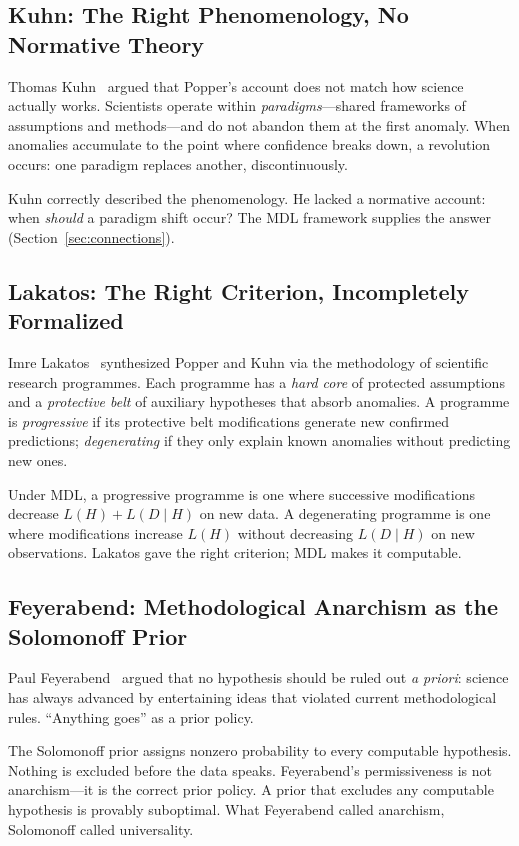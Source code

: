 \subsection{Kuhn: The Right Phenomenology, No Normative Theory}

Thomas Kuhn~\cite{kuhn1962} argued that Popper's account does not match how science actually works. Scientists operate within \emph{paradigms}---shared frameworks of assumptions and methods---and do not abandon them at the first anomaly. When anomalies accumulate to the point where confidence breaks down, a revolution occurs: one paradigm replaces another, discontinuously.

Kuhn correctly described the phenomenology. He lacked a normative account: when \emph{should} a paradigm shift occur? The MDL framework supplies the answer (Section~\ref{sec:connections}).

\subsection{Lakatos: The Right Criterion, Incompletely Formalized}

Imre Lakatos~\cite{lakatos1978} synthesized Popper and Kuhn via the methodology of scientific research programmes. Each programme has a \emph{hard core} of protected assumptions and a \emph{protective belt} of auxiliary hypotheses that absorb anomalies. A programme is \emph{progressive} if its protective belt modifications generate new confirmed predictions; \emph{degenerating} if they only explain known anomalies without predicting new ones.

Under MDL, a progressive programme is one where successive modifications decrease $L(H) + L(D \mid H)$ on new data. A degenerating programme is one where modifications increase $L(H)$ without decreasing $L(D \mid H)$ on new observations. Lakatos gave the right criterion; MDL makes it computable.

\subsection{Feyerabend: Methodological Anarchism as the Solomonoff Prior}

Paul Feyerabend~\cite{feyerabend1975} argued that no hypothesis should be ruled out \emph{a priori}: science has always advanced by entertaining ideas that violated current methodological rules. ``Anything goes'' as a prior policy.

The Solomonoff prior assigns nonzero probability to every computable hypothesis. Nothing is excluded before the data speaks. Feyerabend's permissiveness is not anarchism---it is the correct prior policy. A prior that excludes any computable hypothesis is provably suboptimal. What Feyerabend called anarchism, Solomonoff called universality.

